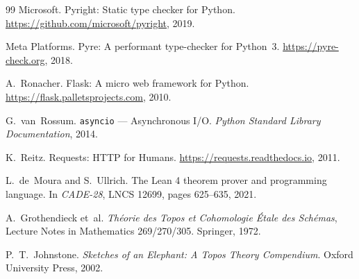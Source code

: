 \documentclass[11pt]{article}
\begin{document}
\begin{thebibliography}{99}
Microsoft.
\newblock Pyright: Static type checker for Python.
\newblock \url{https://github.com/microsoft/pyright}, 2019.

Meta Platforms.
\newblock Pyre: A performant type-checker for Python~3.
\newblock \url{https://pyre-check.org}, 2018.

A.~Ronacher.
\newblock Flask: A micro web framework for Python.
\newblock \url{https://flask.palletsprojects.com}, 2010.

G.~van~Rossum.
\newblock \texttt{asyncio} --- Asynchronous I/O.
\newblock \textit{Python Standard Library Documentation}, 2014.

K.~Reitz.
\newblock Requests: HTTP for Humans.
\newblock \url{https://requests.readthedocs.io}, 2011.

L.~de~Moura and S.~Ullrich.
\newblock The Lean 4 theorem prover and programming language.
\newblock In \textit{CADE-28}, LNCS 12699, pages 625--635, 2021.

A.~Grothendieck et~al.
\newblock \textit{Th\'eorie des Topos et Cohomologie \'Etale des
  Sch\'emas}, Lecture Notes in Mathematics 269/270/305.
\newblock Springer, 1972.

P.~T.~Johnstone.
\newblock \textit{Sketches of an Elephant: A Topos Theory Compendium}.
\newblock Oxford University Press, 2002.

\end{thebibliography}
\end{document}
